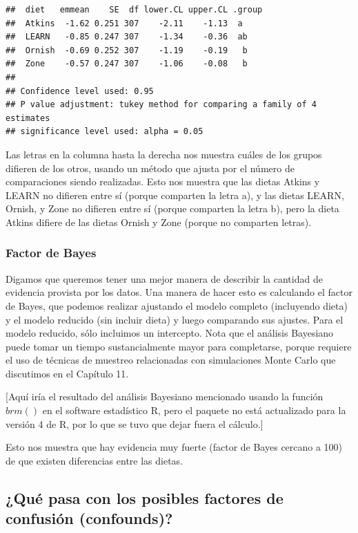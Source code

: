 \documentclass[
  12pt,
]{book}
\begin{document}
\begin{verbatim}
##  diet   emmean    SE  df lower.CL upper.CL .group
##  Atkins  -1.62 0.251 307    -2.11    -1.13  a    
##  LEARN   -0.85 0.247 307    -1.34    -0.36  ab   
##  Ornish  -0.69 0.252 307    -1.19    -0.19   b   
##  Zone    -0.57 0.247 307    -1.06    -0.08   b   
## 
## Confidence level used: 0.95 
## P value adjustment: tukey method for comparing a family of 4 estimates 
## significance level used: alpha = 0.05
\end{verbatim}

Las letras en la columna hasta la derecha nos muestra cuáles de los grupos difieren de los otros, usando un método que ajusta por el número de comparaciones siendo realizadas. Esto nos muestra que las dietas Atkins y LEARN no difieren entre sí (porque comparten la letra a), y las dietas LEARN, Ornish, y Zone no difieren entre sí (porque comparten la letra b), pero la dieta Atkins difiere de las dietas Ornish y Zone (porque no comparten letras).

\hypertarget{factor-de-bayes}{%
\subsubsection{Factor de Bayes}\label{factor-de-bayes}}

Digamos que queremos tener una mejor manera de describir la cantidad de evidencia provista por los datos. Una manera de hacer esto es calculando el factor de Bayes, que podemos realizar ajustando el modelo completo (incluyendo dieta) y el modelo reducido (sin incluir dieta) y luego comparando sus ajustes. Para el modelo reducido, sólo incluimos un intercepto. Nota que el análisis Bayesiano puede tomar un tiempo sustancialmente mayor para completarse, porque requiere el uso de técnicas de muestreo relacionadas con simulaciones Monte Carlo que discutimos en el Capítulo 11.

{[}Aquí iría el resultado del análisis Bayesiano mencionado usando la función \(brm()\) en el software estadístico R, pero el paquete no está actualizado para la versión 4 de R, por lo que se tuvo que dejar fuera el cálculo.{]}

Esto nos muestra que hay evidencia muy fuerte (factor de Bayes cercano a 100) de que existen diferencias entre las dietas.

\hypertarget{quuxe9-pasa-con-los-posibles-factores-de-confusiuxf3n-confounds}{%
\subsection{¿Qué pasa con los posibles factores de confusión (confounds)?}\label{quuxe9-pasa-con-los-posibles-factores-de-confusiuxf3n-confounds}}
\end{document}
